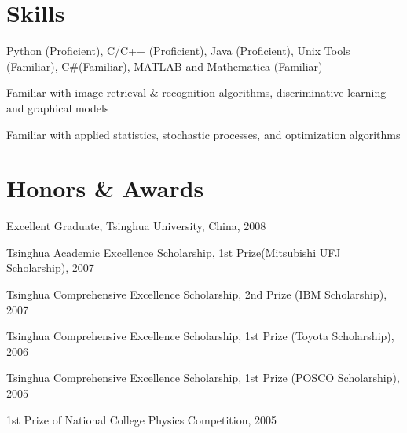 \documentclass[10pt,letterpaper]{article}
\renewenvironment{itemize}{
  \begin{list}{}{
    \setlength{\leftmargin}{1.5em}
    \setlength{\itemsep}{0.25em}
    \setlength{\parskip}{0pt}
    \setlength{\parsep}{0.25em}
  }
}{
  \end{list}
}
\begin{document}
\section*{Skills}
\begin{itemize}
\item Python (Proficient), C/C++ (Proficient), Java (Proficient), Unix Tools (Familiar), C\#(Familiar), MATLAB and Mathematica (Familiar) %
\item Familiar with image retrieval \& recognition algorithms, discriminative learning and graphical models
\item Familiar with applied statistics, stochastic processes, and optimization algorithms
\end{itemize}

\section*{Honors \& Awards}
\begin{itemize}
\item Excellent Graduate, Tsinghua University, China, 2008
\item Tsinghua Academic Excellence Scholarship, 1st Prize(Mitsubishi UFJ Scholarship), 2007
\item Tsinghua Comprehensive Excellence Scholarship, 2nd Prize (IBM Scholarship), 2007
\item Tsinghua Comprehensive Excellence Scholarship, 1st Prize (Toyota Scholarship), 2006
\item Tsinghua Comprehensive Excellence Scholarship, 1st Prize (POSCO Scholarship), 2005
\item 1st Prize of National College Physics Competition, 2005
\end{itemize}
\end{document}
